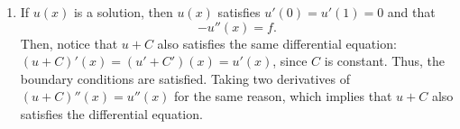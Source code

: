 {\begin{solution}
\begin{enumerate}
\[ =   \left[\begin{array}{c} f(x_1) \\[0.25em] f(x_2) \\[0.25em] \vdots \\[0.25em] f(x_{N-1}) \\[0.25em] f(x_N) \end{array}\right].
\]
Included is Matlab code that can be used to generate the finite difference solution and the error between it and the exact solution:

\begin{figure}
\centering
\texttt{[image: p4c\_sol.png]}
\caption{Finite difference solutions for various $N$}
\end{figure}
\begin{figure}
\centering
\texttt{[image: p4c\_error.png]}
\caption{Error between the exact solution and finite difference solution at points $x_i$.}
\end{figure}
\item If $u(x)$ is a solution, then $u(x)$ satisfies $u'(0) = u'(1) = 0$ and that
\[
-u''(x) = f.
\]
Then, notice that $u + C$ also satisfies the same differential equation: $(u+C)'(x) = (u'+C')(x) = u'(x)$, since $C$ is constant. Thus, the boundary conditions are satisfied. Taking two derivatives of $(u+C)''(x) = u''(x)$ for the same reason, which implies that $u+C$ also satisfies the differential equation.
\end{enumerate}
\end{solution}
}

